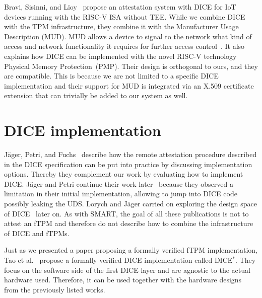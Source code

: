 Bravi, Sisinni, and Lioy~\cite{Bravi2023} propose an attestation system with DICE for IoT devices running with the RISC-V ISA without TEE\@.
While we combine DICE with the TPM infrastructure, they combine it with the Manufacturer Usage Description (MUD).
MUD allows a device to signal to the network what kind of access and network functionality it requires for further access control~\cite{Lear2019}.
It also explains how DICE can be implemented with the novel RISC-V technology Physical Memory Protection~(PMP).
Their design is orthogonal to ours, and they are compatible.
This is because we are not limited to a specific DICE implementation and their support for MUD is integrated via an X.509 certificate extension that can trivially be added to our system as well.

\section{DICE implementation}

Jäger, Petri, and Fuchs~\cite{Jaeger2017} describe how the remote attestation procedure described in the DICE specification can be put into practice by discussing implementation options.
Thereby they complement our work by evaluating how to implement \ac{DICE}\@.
Jäger and Petri continue their work later~\cite{Jaeger2020} because they observed a limitation in their initial implementation, allowing to jump into \ac{DICE} code possibly leaking the \ac{UDS}.
Lorych and Jäger carried on exploring the design space of DICE~\cite{Lorych2022} later on.
As with SMART, the goal of all these publications is not to attest an \ac{fTPM} and therefore do not describe how to combine the infrastructure of DICE and \acp{fTPM}.

Just as we presented a paper proposing a formally verified \ac{fTPM} implementation, Tao et al.~\cite{272306} propose a formally verified \ac{DICE} implementation called DICE\( ^* \).
They focus on the software side of the first DICE layer and are agnostic to the actual hardware used.
Therefore, it can be used together with the hardware designs from the previously listed works.




